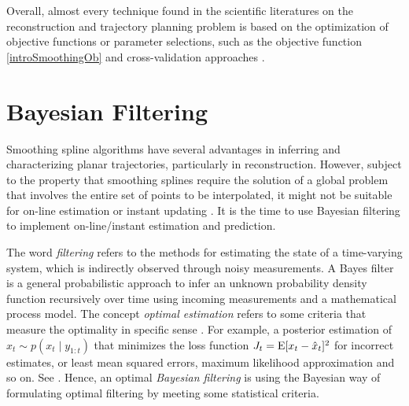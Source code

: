 %

Overall, almost every technique found in the scientific literatures on the reconstruction and trajectory planning problem is based on the optimization of objective functions or parameter selections, such as the objective function \eqref{introSmoothingOb} and cross-validation approaches \citep{gasparetto2007new}. 



\section{Bayesian Filtering}

Smoothing spline algorithms have several advantages in inferring and characterizing planar trajectories, particularly in reconstruction. However, subject to the property that smoothing splines require the solution of a global problem that involves the entire set of points to be interpolated, it might not be suitable for on-line estimation or instant updating \citep{biagiotti2013online}. It is the time to use Bayesian filtering to implement on-line/instant estimation and prediction. 

The word \textit{filtering} refers to the methods for estimating the state of a time-varying system, which is indirectly observed through noisy measurements. A Bayes filter is a general probabilistic approach to infer an unknown probability density function recursively over time using incoming measurements and a mathematical process model. The concept \textit{optimal estimation} refers to some criteria that measure the optimality in specific sense \citep{anderson1979optimal}. For example, a posterior estimation of $\hat{x}_t\sim p(x_t\mid y_{1:t})$ that minimizes the loss function $J_t=\mathrm{E}\lbrack x_t-\hat{x}_t\rbrack^2$ for incorrect estimates, or least mean squared errors, maximum likelihood approximation and so on. See \eg  \citep{chen2003bayesian, sarkka2013bayesian}. Hence, an optimal \textit{Bayesian filtering} is using the Bayesian way of formulating optimal filtering by meeting some statistical criteria. 

